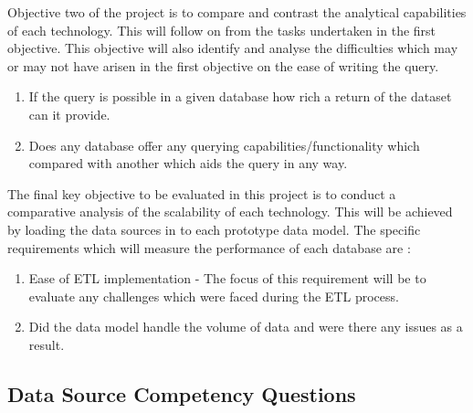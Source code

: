 \parindent 0pt Objective two of the project is to compare and contrast the analytical capabilities of each technology. This will follow on from the tasks undertaken in the first objective. This objective will also identify and analyse the difficulties which may or may not have arisen in the first objective on the ease of writing the query.

\begin{enumerate}
\item If the query is possible in a given database how rich a return of the dataset can it provide.
\item Does any database offer any querying capabilities/functionality which compared with another which aids the query in any way.
\end{enumerate}

\parindent 0pt The final key objective to be evaluated in this project is to conduct a comparative analysis of the scalability of each technology. This will be achieved by loading the data sources in to each prototype data model. The specific requirements which will measure the performance of each database are :

\begin{enumerate}
\item Ease of ETL implementation - The focus of this requirement will be to evaluate any challenges which were faced during the ETL process.
\item Did the data model handle the volume of data and were there any issues as a result.
\end{enumerate}
\newpage
\subsection{Data Source Competency Questions}\label{competency}

